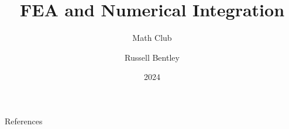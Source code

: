 \documentclass{beamer}
\title{FEA and Numerical Integration}
\subtitle{Math Club}
\author{Russell Bentley}
\institute{Stony Brook}
\date{2024}
\begin{document}
%

\frame{\titlepage}



















\begin{frame}[allowframebreaks]{References}
    \tiny
    \printbibliography
\end{frame}
\end{document}

